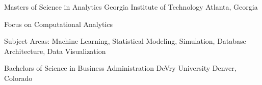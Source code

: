 

\begin{cventries}

  \cventry
    {Masters of Science in Analytics} %
    {Georgia Institute of Technology} %
    {Atlanta, Georgia} %
    {} %
    {
      \begin{cvitems} %
        \item {Focus on Computational Analytics}
        \item {Subject Areas: Machine Learning, Statistical Modeling, Simulation, Database Architecture, Data Visualization}
      \end{cvitems}
    }
    
  \cventry
    {Bachelors of Science in Business Administration} %
    {DeVry University} %
    {Denver, Colorado} %
    {} %
    {
    }    

\end{cventries}
